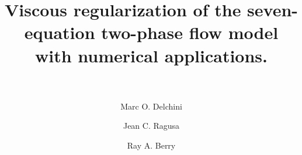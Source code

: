 \documentclass[preprint,10pt]{elsarticle}
\begin{document}
\begin{frontmatter}


\title{Viscous regularization of the seven-equation two-phase flow model with numerical applications.\\
\\
}
\author{Marc O. Delchini  }

\author{Jean C. Ragusa}

\author{Ray A. Berry}

\address[label1]{Department of Nuclear Engineering, Texas A\&M University, College Station, TX 77843, USA }

\address[label2]{Idaho National Laboratory, Idaho Falls, ID 83415, USA }


\end{frontmatter}
\end{document}
